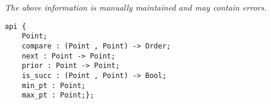 \label{api:Interval\_Domain}

{\tiny \it The above information is manually maintained and may contain errors.}
\begin{verbatim}
api {
    Point;
    compare : (Point , Point) -> Order;
    next : Point -> Point;
    prior : Point -> Point;
    is_succ : (Point , Point) -> Bool;
    min_pt : Point;
    max_pt : Point;};
\end{verbatim}
